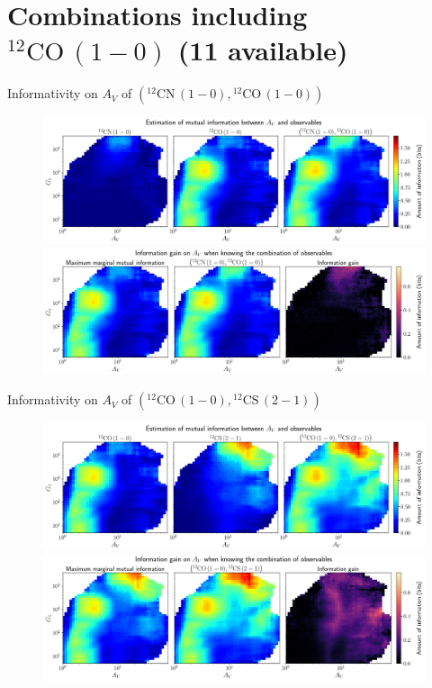 \documentclass{beamer}
\begin{document}
\section{Combinations including $\mathrm{^{12}CO\,(1-0)}$ (11 available)}

\begin{frame}{Informativity on $A_V$ of $\left(\mathrm{^{12}CN\,(1-0)},\mathrm{^{12}CO\,(1-0)}\right)$}
    \begin{figure}
        \centering
        \includegraphics[width=0.95\linewidth]{../mi/av__12cn10_12co10_mi.png}
        \vfill
        \includegraphics[width=0.95\linewidth]{../mi/av__12cn10_12co10_mi_gain.png}
    \end{figure}
\end{frame}

\begin{frame}{Informativity on $A_V$ of $\left(\mathrm{^{12}CO\,(1-0)},\mathrm{^{12}CS\,(2-1)}\right)$}
    \begin{figure}
        \centering
        \includegraphics[width=0.95\linewidth]{../mi/av__12co10_12cs21_mi.png}
        \vfill
        \includegraphics[width=0.95\linewidth]{../mi/av__12co10_12cs21_mi_gain.png}
    \end{figure}
\end{frame}
\end{document}

